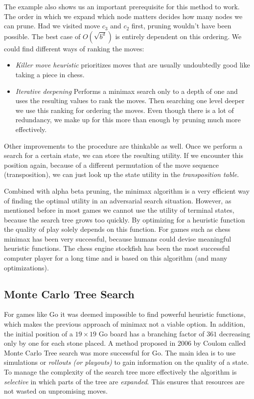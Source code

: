 The example also shows us an important prerequisite for this method to work. The order in which we expand which node matters decides how many nodes we can prune. Had we visited move $ c_3 $ and $ c_2 $ first, pruning wouldn't have been possible. The best case of $ O(\sqrt{b^d}) $ is entirely dependent on this ordering. We could find different ways of ranking the moves:

\begin{itemize}
    \item \textit{Killer move heuristic} prioritizes moves that are usually undoubtedly good like taking a piece in chess.
    \item \textit{Iterative deepening} Performs a minimax search only to a depth of one and uses the resulting values to rank the moves. Then searching one level deeper we use this ranking for ordering the moves. Even though there is a lot of redundancy, we make up for this more than enough by pruning much more effectively.
\end{itemize}

Other improvements to the procedure are thinkable as well. Once we perform a search for a certain state, we can store the resulting utility. If we encounter this position again, because of a different permutation of the move sequence (transposition), we can just look up the state utility in the \textit{transposition table}.

Combined with alpha beta pruning, the minimax algorithm is a very efficient way of finding the optimal utility in an adversarial search situation. However, as mentioned before in most games we cannot use the utility of terminal states, because the search tree grows too quickly. By optimizing for a heuristic function the quality of play solely depends on this function. For games such as chess minimax has been very successful, because humans could devise meaningful heuristic functions. The chess engine stockfish has been the most successful computer player for a long time and is based on this algorithm (and many optimizations). \cite{noauthor_stockfish_2021, noauthor_stockfish_nodate}

\subsection{Monte Carlo Tree Search}
For games like Go it was deemed impossible to find powerful heuristic functions, which makes the previous approach of minimax not a viable option. In addition, the initial position of a $19\times19$ Go board has a branching factor of $361$ decreasing only by one for each stone placed. A method proposed in 2006 by Coulom \cite{coulom_efficient_2007} called Monte Carlo Tree search was more successful for Go. The main idea is to use simulations or \textit{rollouts (or playouts)} to gain information on the quality of a state. To manage the complexity of the search tree more effectively the algorithm is \textit{selective} in which parts of the tree are \textit{expanded}. This ensures that resources are not wasted on unpromising moves.

